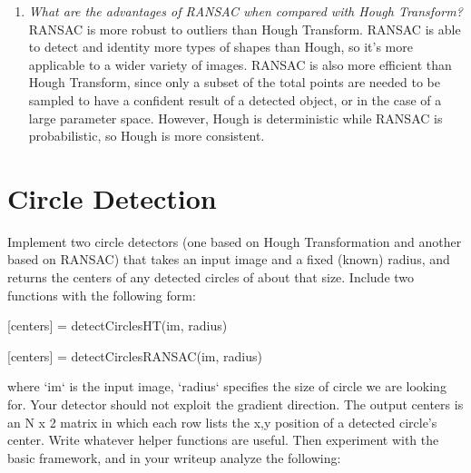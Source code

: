 \documentclass[11pt]{article}
\begin{document}
\begin{enumerate}
        \item \textit{What are the advantages of RANSAC when compared with Hough Transform?}\newline
        RANSAC is more robust to outliers than Hough Transform. RANSAC is able to detect and identity more types of
        shapes than Hough, so it's more applicable to a wider variety of images. RANSAC is also more efficient than
        Hough Transform, since only a subset of the total points are needed to be sampled to have a confident result
        of a detected object, or in the case of a large parameter space. However, Hough is deterministic while RANSAC
        is probabilistic, so Hough is more
        consistent.\newline

    \end{enumerate}


    \section{Circle Detection}

    Implement two circle detectors (one based on Hough Transformation and another based on RANSAC) that takes an input
    image and a fixed (known) radius, and returns the centers of any detected circles of about that size.
    Include two functions with the following form:
    \begin{center}
    [centers]
        = detectCirclesHT(im, radius)
    \end{center}
    \begin{center}
    [centers]
        = detectCirclesRANSAC(im, radius)
    \end{center}
    where ‘im‘ is the input image, ‘radius‘ specifies the size of circle we are looking for.
    Your detector should not exploit the gradient direction. The output centers is an N x 2 matrix in which each row
    lists the x,y position of a detected circle’s center. Write whatever helper functions are useful. Then experiment
    with the basic framework, and in your writeup analyze the following:
\end{document}
